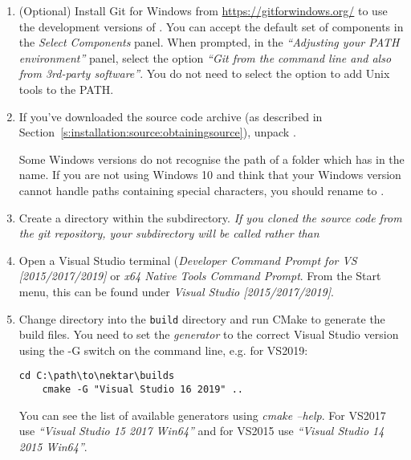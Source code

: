 \begin{enumerate}
\begin{itemize}
  \end{itemize}
  \item (Optional) Install Git for Windows from
  \url{https://gitforwindows.org/} to use the development versions of \nekpp.
  You can accept the default set of components in the \emph{Select Components}
  panel. When prompted, in the \emph{``Adjusting your PATH environment''}
  panel, select the option \emph{``Git from the command line and also from
  3rd-party software''}. You do not need to select the option to add Unix
  tools to the PATH.

  \item If you've downloaded the source code archive (as described in
  Section~\ref{s:installation:source:obtainingsource}), unpack
  .

  \begin{notebox}
    Some Windows versions do not recognise the path of a folder which has
    \inltt{++} in the name. If you are not using Windows 10 and think that your
    Windows version cannot handle paths containing special characters, you
    should rename  to .
  \end{notebox}
  \item Create a  directory within the 
  subdirectory. \textit{If you cloned the source code from the git repository,
  your \nekpp subdirectory will be called  rather than
  }

  \item Open a Visual Studio terminal (\emph{Developer Command Prompt for
  VS [2015/2017/2019]} or \emph{x64 Native Tools Command Prompt}. From the
  Start menu, this can be found under \emph{Visual Studio [2015/2017/2019]}.

  \item Change directory into the \texttt{build} directory and run CMake to
  generate the build files. You need to set the \emph{generator} to the
  correct Visual Studio version using the -G switch on the command line, e.g.
  for VS2019:
  \begin{lstlisting}[style=BashInputStyle]
    cd C:\path\to\nektar\builds
    cmake -G "Visual Studio 16 2019" ..
  \end{lstlisting}
  You can see the list of available generators using \emph{cmake --help}. For
  VS2017 use \emph{``Visual Studio 15 2017 Win64''} and for VS2015 use
  \emph{``Visual Studio 14 2015 Win64''}.


\end{enumerate}
